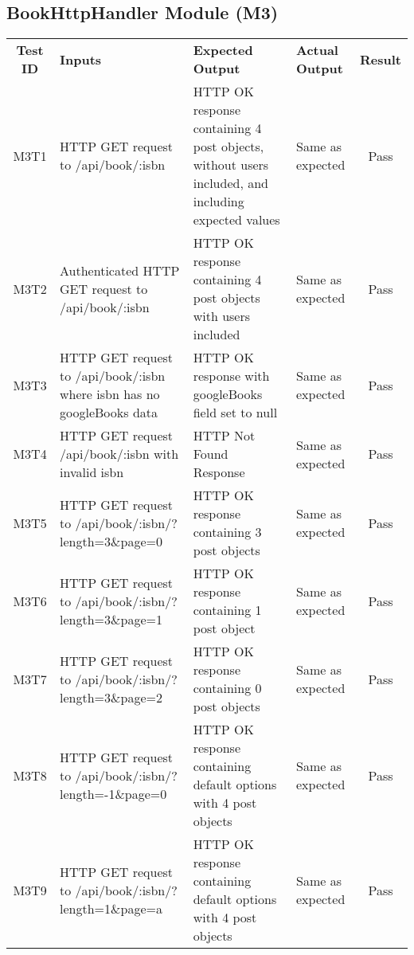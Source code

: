 \documentclass[fullpage]{article}
\begin{document}
\subsection{BookHttpHandler Module (M3)}
\begin{table}[H]
\flushleft
\begin{tabular}{|c|p{4.5cm}|p{3.6cm}|p{3.6cm}|c|}
\hline
 \rowcolor{lightgray} 
\textbf{Test ID} &\textbf{Inputs} &\textbf{Expected Output} &\textbf{Actual Output} &\textbf{Result}\\
M3T1 & HTTP GET request to /api/book/:isbn & HTTP OK response containing 4 post objects, without users included, and including expected values & Same as expected & Pass\\
\hline
M3T2 & Authenticated HTTP GET request to /api/book/:isbn & HTTP OK response containing 4 post objects with users included & Same as expected & Pass\\
\hline
M3T3 & HTTP GET request to /api/book/:isbn where isbn has no googleBooks data & HTTP OK response with googleBooks field set to null & Same as expected & Pass\\
\hline
M3T4 & HTTP GET request /api/book/:isbn with invalid isbn & HTTP Not Found Response  & Same as expected & Pass\\
\hline
M3T5 & HTTP GET request to /api/book/:isbn/?length=3\&page=0 &  HTTP OK response containing 3 post objects & Same as expected & Pass\\
\hline
M3T6 & HTTP GET request to /api/book/:isbn/?length=3\&page=1 &  HTTP OK response containing 1 post object & Same as expected & Pass\\
\hline
M3T7 & HTTP GET request to /api/book/:isbn/?length=3\&page=2 &  HTTP OK response containing 0 post objects & Same as expected & Pass\\
\hline
M3T8 & HTTP GET request to /api/book/:isbn/?length=-1\&page=0 &  HTTP OK response containing default options with 4 post objects & Same as expected & Pass\\
\hline
M3T9 & HTTP GET request to /api/book/:isbn/?length=1\&page=a &  HTTP OK response containing default options with 4 post objects & Same as expected & Pass\\
\hline


\end{tabular}
\end{table}
\end{document}
